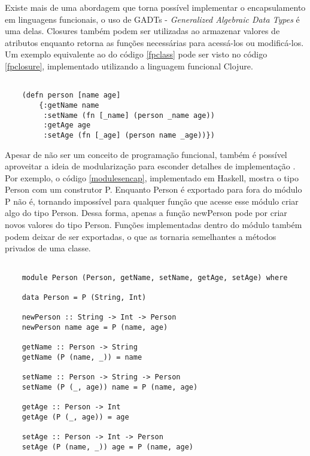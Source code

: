 Existe mais de uma abordagem que torna 
possível implementar o encapsulamento em 
linguagens funcionais, o uso de GADTs - 
\textit{Generalized Algebraic 
Data Types}\cite{existentialhaskell} é uma 
delas. Closures também podem 
ser utilizadas ao armazenar valores de 
atributos enquanto retorna as funções 
necessárias para acessá-los ou modificá-los. 
Um exemplo equivalente ao do código \ref{fpclass} 
pode ser visto no código \ref{fpclosure}, 
implementado utilizando a linguagem funcional Clojure. \cite{classlessjs}

\begin{lstlisting}[caption={Representação de uma classe com closures},label=fpclosure]
    
    (defn person [name age]
        {:getName name
         :setName (fn [_name] (person _name age))
         :getAge age
         :setAge (fn [_age] (person name _age))})

\end{lstlisting}

Apesar de não ser um conceito de programação 
funcional, também é possível aproveitar a ideia 
de modularização para esconder detalhes de 
implementação \cite{mlmodules}. Por exemplo, o 
código \ref{modulesencap}, implementado em 
Haskell, mostra o tipo Person com um construtor 
P. Enquanto Person é exportado para fora do 
módulo P não é, tornando impossível para qualquer 
função que acesse esse módulo criar algo do tipo 
Person. Dessa forma, apenas a função newPerson 
pode por criar novos valores do tipo 
Person. Funções implementadas dentro do módulo 
também podem deixar de ser exportadas, o que 
as tornaria semelhantes a métodos privados 
de uma classe.

\begin{lstlisting}[caption={Módulos como forma de encapsulamento},label=modulesencap]
    
    module Person (Person, getName, setName, getAge, setAge) where

    data Person = P (String, Int)

    newPerson :: String -> Int -> Person
    newPerson name age = P (name, age)

    getName :: Person -> String
    getName (P (name, _)) = name

    setName :: Person -> String -> Person
    setName (P (_, age)) name = P (name, age)

    getAge :: Person -> Int
    getAge (P (_, age)) = age

    setAge :: Person -> Int -> Person
    setAge (P (name, _)) age = P (name, age)

\end{lstlisting}


